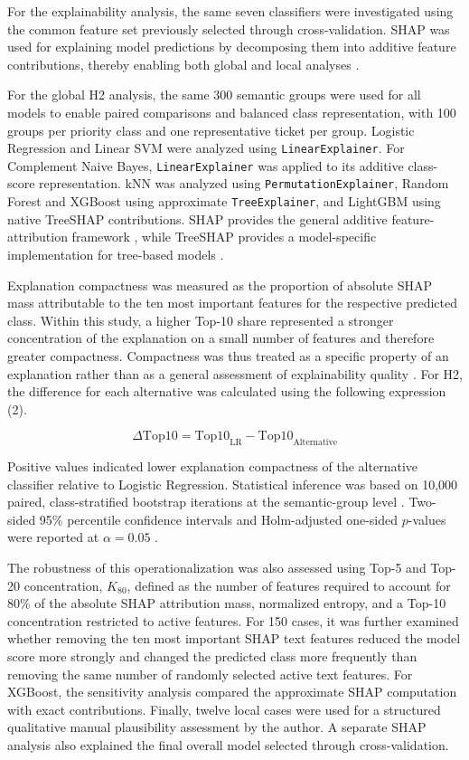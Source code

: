 For the explainability analysis, the same seven classifiers were investigated using the common feature set previously selected through cross-validation. SHAP was used for explaining model predictions by decomposing them into additive feature contributions, thereby enabling both global and local analyses \cite{lundberg2017shap}.

For the global H2 analysis, the same 300 semantic groups were used for all
models to enable paired comparisons and balanced class representation, with
100 groups per priority class and one representative ticket per group. Logistic Regression and Linear SVM were analyzed using
\texttt{LinearExplainer}. For Complement Naive Bayes,
\texttt{LinearExplainer} was applied to its additive class-score
representation. kNN was analyzed using \texttt{PermutationExplainer}, Random
Forest and XGBoost using approximate \texttt{TreeExplainer}, and LightGBM using
native TreeSHAP contributions. SHAP provides the general additive
feature-attribution framework \cite{lundberg2017shap}, while TreeSHAP provides
a model-specific implementation for tree-based models
\cite{lundberg2020trees}.

Explanation compactness was measured as the proportion of absolute SHAP mass attributable to the ten most important features for the respective predicted class. Within this study, a higher Top-10 share represented a stronger concentration of the explanation on a small number of features and therefore greater compactness. Compactness was thus treated as a specific property of an explanation rather than as a general assessment of explainability quality \cite{nauta2023evaluation}. For H2, the difference for each alternative was calculated using the following expression (2).

\begin{equation}
\Delta \mathrm{Top10}
=
\mathrm{Top10}_{\mathrm{LR}}
-
\mathrm{Top10}_{\mathrm{Alternative}}
\label{eq:h2_delta}
\end{equation}

Positive values indicated lower explanation compactness of the alternative classifier relative to Logistic Regression. Statistical inference was based on 10,000 paired, class-stratified bootstrap
iterations at the semantic-group level \cite{efron1979bootstrap}. Two-sided
95\% percentile confidence intervals and Holm-adjusted one-sided $p$-values
were reported at $\alpha = 0.05$ \cite{holm1979simple}.

The robustness of this operationalization was also assessed using Top-5 and Top-20 concentration, \(K_{80}\), defined as the number of features required to account for 80\% of the absolute SHAP attribution mass, normalized entropy, and a Top-10 concentration restricted to active features. For 150 cases, it was further examined whether removing the ten most important SHAP text features reduced the model score more strongly and changed the predicted class more frequently than removing the same number of randomly selected active text features. For XGBoost, the sensitivity analysis compared the approximate SHAP computation with exact contributions. Finally, twelve local cases were used for a structured qualitative manual plausibility assessment by the author. A separate SHAP analysis also explained the final overall model selected through cross-validation.
